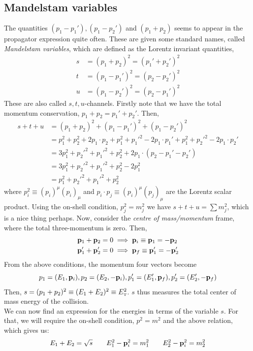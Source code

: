 \subsection{Mandelstam variables}
The quantities $(p_1-p_1'), (p_1-p_2')$ and $(p_1+p_2)$ seems to appear in the propagator expression quite often. These are given some standard names, called \textit{Mandelstam variables}, which are defined as the Lorentz invariant quantities,
\begin{align*}
    s&=(p_1+p_2)^2 = (p_1'+p_2')^2\\
    t&=(p_1-p_1')^2 = (p_2-p_2')^2\\
    u&=(p_1-p_2')^2 = (p_2-p_1')^2
\end{align*}
These are also called $s,t,u$-channels. Firstly note that we have the total momentum conservation, $p_1+p_2=p_1'+p_2'$. Then,
\begin{align*}
    s+t+u &= (p_1+p_2)^2 + (p_1-p_1')^2 + (p_1-p_2')^2 \\
    &=p_1^2+p_2^2+2p_1\cdot p_2 +p_1^2+p_1'^2-2p_1\cdot p_1'+p_1^2+p_2'^2-2p_1\cdot p_2'\\
    &=3p_1^2 +p_2'^2+p_1'^2 +p_2^2+2p_1\cdot(p_2-p_1'-p_2')\\
    &=3p_1^2 +p_2'^2+p_1'^2 +p_2^2-2p_1^2\\
    &=p_1^2 +p_2'^2+p_1'^2 +p_2^2
\end{align*}
where $p_i^2\equiv (p_i)^\mu(p_i)_\mu$ and $p_i\cdot p_j \equiv (p_i)^\mu(p_j)_\mu$ are the Lorentz scalar product. Using the on-shell condition, $p_j^2=m_j^2$ we have $s+t+u=\sum m_j^2$, which is a nice thing perhaps. Now, consider the \textit{centre of mass/momentum} frame, where the total three-momentum is zero. Then, 
\begin{align*}
    \vb{p}_1+\vb{p}_2&=0 \implies \vb{p}_i \equiv \vb{p}_1 = -\vb{p}_2\\
    \vb{p}_1'+\vb{p}_2'&=0 \implies \vb{p}_f \equiv \vb{p}_1' = -\vb{p}_2'
\end{align*}
From the above conditions, the momentum four vectors become $$p_1=(E_1, \vb{p}_i),p_2=(E_2, -\vb{p}_i),p_1'=(E_1', \vb{p}_f),p_2'=(E_2', -\vb{p}_f)$$
Then, $s = (p_1+p_2)^2 \equiv (E_1+E_2)^2\equiv E_{\text{\tiny T}}^2$. $s$ thus measures the total center of mass energy of the collision.\\[0.2cm]
We can now find an expression for the energies in terms of the variable $s$. For that, we will require the on-shell condition, $p^2=m^2$ and the above relation, which gives us:
\begin{align*}
    E_1+E_2 = \sqrt{s} \qquad E_1^2-\vb{p}_i^2 = m_1^2 \qquad E_2^2-\vb{p}_i^2 = m_2^2 
\end{align*}
